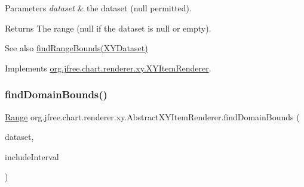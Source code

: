 \begin{DoxyParams}{Parameters}
{\em dataset} & the dataset ({\ttfamily null} permitted).\\
\hline
\end{DoxyParams}
\begin{DoxyReturn}{Returns}
The range ({\ttfamily null} if the dataset is {\ttfamily null} or empty).
\end{DoxyReturn}
\begin{DoxySeeAlso}{See also}
\mbox{\hyperlink{classorg_1_1jfree_1_1chart_1_1renderer_1_1xy_1_1_abstract_x_y_item_renderer_a5397cc245f962e8ae07189118297330b}{find\+Range\+Bounds(\+X\+Y\+Dataset)}} 
\end{DoxySeeAlso}


Implements \mbox{\hyperlink{interfaceorg_1_1jfree_1_1chart_1_1renderer_1_1xy_1_1_x_y_item_renderer_a77925018c73214f58daac73147ba5e52}{org.\+jfree.\+chart.\+renderer.\+xy.\+X\+Y\+Item\+Renderer}}.

\mbox{\label{classorg_1_1jfree_1_1chart_1_1renderer_1_1xy_1_1_abstract_x_y_item_renderer_a544e92256a7b92c4ca49e46df84de6a3}} 
\subsubsection{\texorpdfstring{find\+Domain\+Bounds()}{findDomainBounds()}\hspace{0.1cm}{\footnotesize\ttfamily [2/2]}}
{\footnotesize\ttfamily \mbox{\hyperlink{classorg_1_1jfree_1_1data_1_1_range}{Range}} org.\+jfree.\+chart.\+renderer.\+xy.\+Abstract\+X\+Y\+Item\+Renderer.\+find\+Domain\+Bounds (\begin{DoxyParamCaption}\item[{\mbox{\hyperlink{interfaceorg_1_1jfree_1_1data_1_1xy_1_1_x_y_dataset}{X\+Y\+Dataset}}}]{dataset,  }\item[{boolean}]{include\+Interval }\end{DoxyParamCaption})\hspace{0.3cm}{\ttfamily [protected]}}

